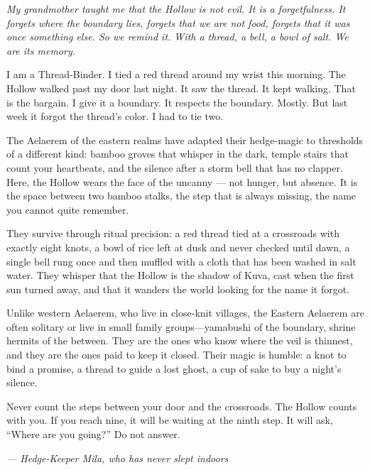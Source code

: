 \noindent
{\Large
\textit{My grandmother taught me that the Hollow is not evil. It is a forgetfulness. It forgets where the boundary lies, forgets that we are not food, forgets that it was once something else. So we remind it. With a thread, a bell, a bowl of salt. We are its memory.}

\vspace{0.5em}

I am a Thread-Binder. I tied a red thread around my wrist this morning. The Hollow walked past my door last night. It saw the thread. It kept walking. That is the bargain. I give it a boundary. It respects the boundary. Mostly. But last week it forgot the thread's color. I had to tie two.

\vspace{0.5em}

The Aelaerem of the eastern realms have adapted their hedge-magic to thresholds of a different kind: bamboo groves that whisper in the dark, temple stairs that count your heartbeats, and the silence after a storm bell that has no clapper. Here, the Hollow wears the face of the uncanny --- not hunger, but absence. It is the space between two bamboo stalks, the step that is always missing, the name you cannot quite remember.

They survive through ritual precision: a red thread tied at a crossroads with exactly eight knots, a bowl of rice left at dusk and never checked until dawn, a single bell rung once and then muffled with a cloth that has been washed in salt water. They whisper that the Hollow is the shadow of Kuva, cast when the first sun turned away, and that it wanders the world looking for the name it forgot.

Unlike western Aelaerem, who live in close-knit villages, the Eastern Aelaerem are often solitary or live in small family groups---yamabushi of the boundary, shrine hermits of the between. They are the ones who know where the veil is thinnest, and they are the ones paid to keep it closed. Their magic is humble: a knot to bind a promise, a thread to guide a lost ghost, a cup of sake to buy a night's silence.

\vspace{0.5em}

Never count the steps between your door and the crossroads. The Hollow counts with you. If you reach nine, it will be waiting at the ninth step. It will ask, ``Where are you going?'' Do not answer.

\vspace{1em}

\noindent\textit{--- Hedge-Keeper Mila, who has never slept indoors}
}

